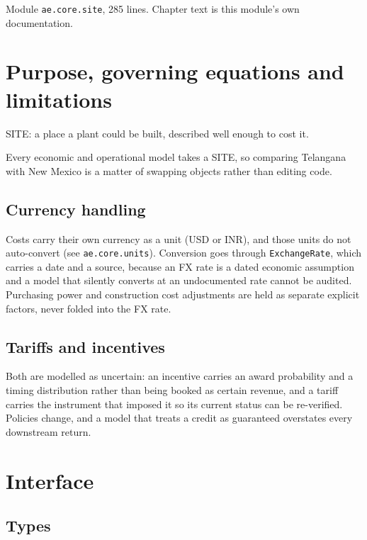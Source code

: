 \documentclass[10pt,a4paper,twoside]{report}
\begin{document}

{\footnotesize\color{slate}Module \texttt{ae.core.site}, 285 lines. Chapter text is this module's own documentation.\par}

\section{Purpose, governing equations and limitations}

SITE: a place a plant could be built, described well enough to cost it.

Every economic and operational model takes a SITE, so comparing Telangana with New Mexico is a matter of swapping objects rather than editing code.

\subsection*{Currency handling}

Costs carry their own currency as a unit (USD or INR), and those units do not auto-convert (see \texttt{ae.core.units}). Conversion goes through \texttt{ExchangeRate}, which carries a date and a source, because an FX rate is a dated economic assumption and a model that silently converts at an undocumented rate cannot be audited. Purchasing power and construction cost adjustments are held as separate explicit factors, never folded into the FX rate.

\subsection*{Tariffs and incentives}

Both are modelled as uncertain: an incentive carries an award probability and a timing distribution rather than being booked as certain revenue, and a tariff carries the instrument that imposed it so its current status can be re-verified. Policies change, and a model that treats a credit as guaranteed overstates every downstream return.

\section{Interface}

\subsection*{Types}
\end{document}
